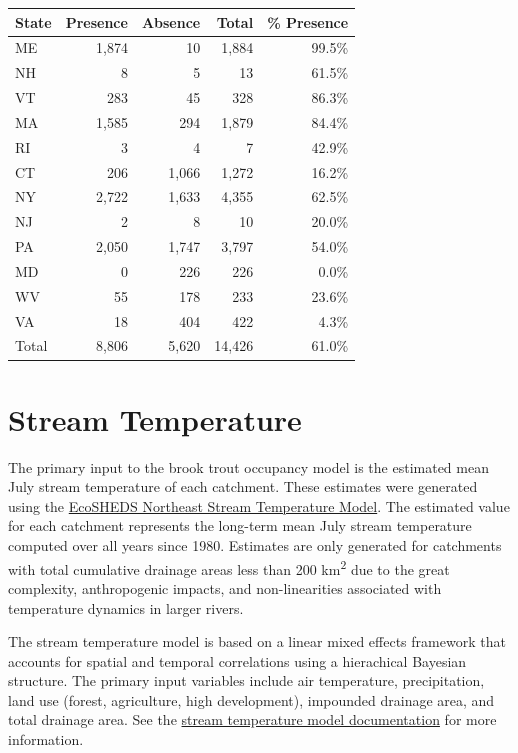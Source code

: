 \documentclass[
]{book}
\begin{document}
\begin{tabular}{l|r|r|r|r}
\hline
State & Presence & Absence & Total & \% Presence\\
\hline
ME & 1,874 & 10 & 1,884 & 99.5\%\\
\hline
NH & 8 & 5 & 13 & 61.5\%\\
\hline
VT & 283 & 45 & 328 & 86.3\%\\
\hline
MA & 1,585 & 294 & 1,879 & 84.4\%\\
\hline
RI & 3 & 4 & 7 & 42.9\%\\
\hline
CT & 206 & 1,066 & 1,272 & 16.2\%\\
\hline
NY & 2,722 & 1,633 & 4,355 & 62.5\%\\
\hline
NJ & 2 & 8 & 10 & 20.0\%\\
\hline
PA & 2,050 & 1,747 & 3,797 & 54.0\%\\
\hline
MD & 0 & 226 & 226 & 0.0\%\\
\hline
WV & 55 & 178 & 233 & 23.6\%\\
\hline
VA & 18 & 404 & 422 & 4.3\%\\
\hline
Total & 8,806 & 5,620 & 14,426 & 61.0\%\\
\hline
\end{tabular}

\hypertarget{stream-temperature}{%
\section{Stream Temperature}\label{stream-temperature}}

The primary input to the brook trout occupancy model is the estimated mean July stream temperature of each catchment. These estimates were generated using the \href{https://ecosheds.org/models/stream-temperature/latest/}{EcoSHEDS Northeast Stream Temperature Model}. The estimated value for each catchment represents the long-term mean July stream temperature computed over all years since 1980. Estimates are only generated for catchments with total cumulative drainage areas less than 200 km\textsuperscript{2} due to the great complexity, anthropogenic impacts, and non-linearities associated with temperature dynamics in larger rivers.

The stream temperature model is based on a linear mixed effects framework that accounts for spatial and temporal correlations using a hierachical Bayesian structure. The primary input variables include air temperature, precipitation, land use (forest, agriculture, high development), impounded drainage area, and total drainage area. See the \href{https://ecosheds.org/models/stream-temperature/latest/}{stream temperature model documentation} for more information.
\end{document}
